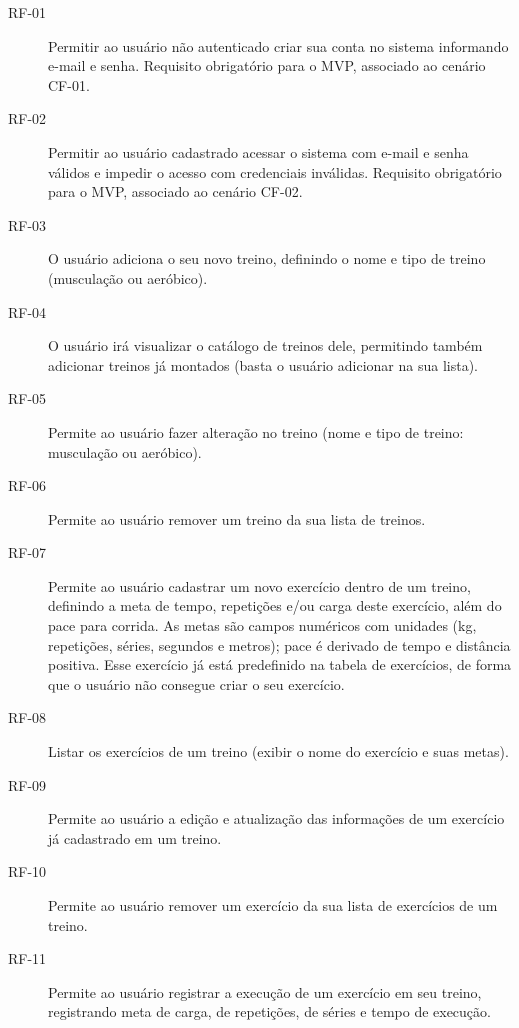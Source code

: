 \begin{description}
\item[RF-01] Permitir ao usuário não autenticado criar sua conta no sistema informando e-mail e senha. Requisito obrigatório para o MVP, associado ao cenário CF-01.

\item[RF-02] Permitir ao usuário cadastrado acessar o sistema com e-mail e senha válidos e impedir o acesso com credenciais inválidas. Requisito obrigatório para o MVP, associado ao cenário CF-02.

\item[RF-03] O usuário adiciona o seu novo treino, definindo o nome e tipo de treino (musculação ou aeróbico).

\item[RF-04] O usuário irá visualizar o catálogo de treinos dele, permitindo também adicionar treinos já montados (basta o usuário adicionar na sua lista).

\item[RF-05] Permite ao usuário fazer alteração no treino (nome e tipo de treino: musculação ou aeróbico).

\item[RF-06] Permite ao usuário remover um treino da sua lista de treinos.

\item[RF-07] Permite ao usuário cadastrar um novo exercício dentro de um treino, definindo a meta de tempo, repetições e/ou carga deste exercício, além do pace para corrida. As metas são campos numéricos com unidades (kg, repetições, séries, segundos e metros); pace é derivado de tempo e distância positiva. Esse exercício já está predefinido na tabela de exercícios, de forma que o usuário não consegue criar o seu exercício.

\item[RF-08] Listar os exercícios de um treino (exibir o nome do exercício e suas metas).

\item[RF-09] Permite ao usuário a edição e atualização das informações de um exercício já cadastrado em um treino.

\item[RF-10] Permite ao usuário remover um exercício da sua lista de exercícios de um treino.

\item[RF-11] Permite ao usuário registrar a execução de um exercício em seu treino, registrando meta de carga, de repetições, de séries e tempo de execução.


\end{description}
